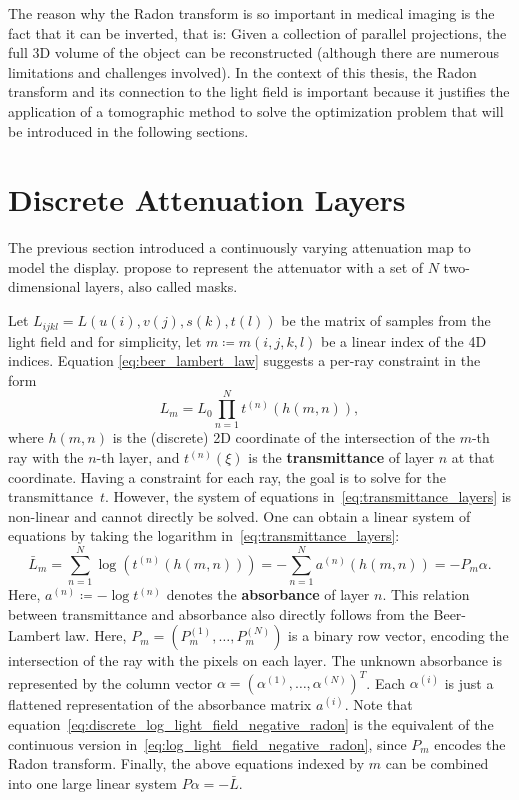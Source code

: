 The reason why the Radon transform is so important in medical imaging is the fact that it can be inverted, that is:
Given a collection of parallel projections, the full 3D volume of the object can be reconstructed (although there are numerous limitations and challenges involved).
In the context of this thesis, the Radon transform and its connection to the light field is important because it justifies the application of a tomographic method to solve the optimization problem that will be introduced in the following sections.

\section{Discrete Attenuation Layers}

The previous section introduced a continuously varying attenuation map to model the display.
\cite{WetzsteinTomo} propose to represent the attenuator with a set of $N$ two-dimensional layers, also called masks.

Let $L_{ijkl} = L(u(i), v(j), s(k), t(l))$ be the matrix of samples from the light field and for simplicity, let $m \coloneqq m(i, j, k, l)$ be a linear index of the 4D indices.
Equation \ref{eq:beer_lambert_law} suggests a per-ray constraint in the form
\begin{equation}\label{eq:transmittance_layers}
	L_m = L_0 \prod_{n=1}^{N} t^{(n)} (h(m, n)), 
\end{equation}
where $h(m, n)$ is the (discrete) 2D coordinate of the intersection of the \mbox{$m$-th} ray with the \mbox{$n$-th} layer, and $t^{(n)}(\xi)$ is the \textbf{transmittance} of layer $n$ at that coordinate.
Having a constraint for each ray, the goal is to solve for the transmittance~$t$.
However, the system of equations in~\ref{eq:transmittance_layers} is non-linear and cannot directly be solved.
One can obtain a linear system of equations by taking the logarithm in~\ref{eq:transmittance_layers}:
\begin{equation}\label{eq:discrete_log_light_field_negative_radon}
	\bar{L}_m 	=	\sum_{n = 1}^{N}
					\log \left( t^{(n)} (h(m, n)) \right) 
				= 	-\sum_{n = 1}^{N} a^{(n)} (h(m, n)) 
				= 	-P_m \alpha.
\end{equation}
Here, $a^{(n)} \coloneqq -\log t^{(n)}$ denotes the \textbf{absorbance} of layer $n$. 
This relation between transmittance and absorbance also directly follows from the Beer-Lambert law.
Here, $P_m = \left( P_m^{(1)}, \dots, P_m^{(N)} \right)$ is a binary row vector, encoding the intersection of the ray with the pixels on each layer.
The unknown absorbance is represented by the column vector $\alpha = \left( \alpha^{(1)}, \dots, \alpha^{(N)} \right)^T$.
Each $\alpha^{(i)}$ is just a flattened representation of the absorbance matrix $a^{(i)}$.
Note that equation~\ref{eq:discrete_log_light_field_negative_radon} is the equivalent of the continuous version in~\ref{eq:log_light_field_negative_radon}, since $P_m$ encodes the Radon transform.
Finally, the above equations indexed by $m$ can be combined into one large linear system $P \alpha = -\bar{L}$.

